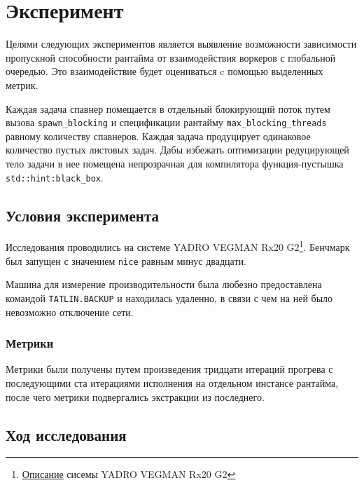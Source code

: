 
\section{Эксперимент}

Целями следующих экспериментов является выявление возможности зависимости пропускной способности рантайма от взаимодействия воркеров с глобальной очередью. Это взаимодействие будет оцениваться c помощью выделенных метрик.

Каждая задача спавнер помещается в отдельный блокирующий поток путем вызова \verb|spawn_blocking| и спецификации рантайму \verb|max_blocking_threads| равному количеству спавнеров. Каждая задача продуцирует одинаковое количество пустых листовых задач. Дабы избежать оптимизации редуцирующей тело задачи в нее помещена непрозрачная для компилятора функция-пустышка \verb|std::hint:black_box|.

\subsection{Условия эксперимента}

Исследования проводились на системе YADRO VEGMAN Rx20 G2\footnote{\href{https://yadro.com/ru/vegman/rx20g2/specs}{Описание} сисемы YADRO VEGMAN Rx20 G2}. Бенчмарк был запущен с значением \verb|nice| равным минус двадцати.

Машина для измерение производительности была любезно предоставлена командой \verb|TATLIN.BACKUP| и находилась удаленно, в связи с чем на ней было невозможно отключение сети.

\subsubsection{Метрики}

Метрики были получены путем произведения тридцати итераций прогрева с последующими ста итерациями исполнения на отдельном инстансе рантайма, после чего метрики подвергались экстракции из последнего.

\subsection{Ход исследования}

